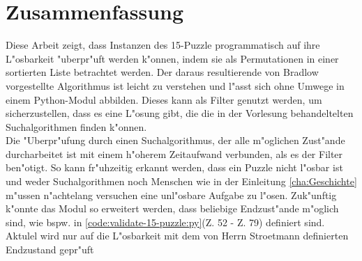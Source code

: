 \chapter{Zusammenfassung}
Diese Arbeit zeigt, dass Instanzen des 15-Puzzle programmatisch auf ihre L"osbarkeit "uberpr"uft werden k"onnen, indem sie als Permutationen in einer sortierten Liste betrachtet werden.
Der daraus resultierende von Bradlow vorgestellte Algorithmus ist leicht zu verstehen und l"asst sich ohne Umwege in einem Python-Modul abbilden. Dieses kann als Filter genutzt werden, um sicherzustellen, dass es eine L"osung gibt, die die in der Vorlesung behandeltelten Suchalgorithmen \cite[vgl.][Kap. 2]{github-stroetmann:online} finden  k"onnen.\\
Die "Uberpr"ufung durch einen Suchalgorithmus, der alle m"oglichen Zust"ande durcharbeitet ist mit einem h"oherem Zeitaufwand verbunden, als es der Filter ben"otigt.
So kann fr"uhzeitig erkannt werden, dass ein Puzzle nicht l"osbar ist und weder Suchalgorithmen noch Menschen wie in der Einleitung \ref{cha:Geschichte} m"ussen n"achtelang versuchen eine unl"osbare Aufgabe zu l"osen.
\WNL
Zuk"unftig k"onnte das Modul so erweitert werden, dass beliebige Endzust"ande m"oglich sind, wie bspw. in \ref{code:validate-15-puzzle:py}(Z. 52 - Z. 79) definiert sind. Aktulel wird nur auf die L"osbarkeit mit dem von Herrn Stroetmann definierten Endzustand gepr"uft